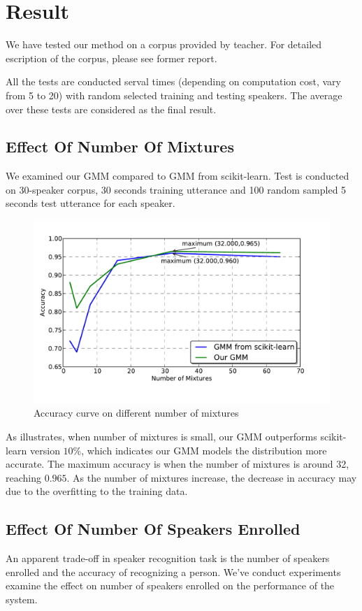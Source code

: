 \section{Result}
We have tested our method on a corpus provided by teacher. For detailed
escription of the corpus, please see former report.

All the tests are conducted serval times (depending on computation cost,
vary from 5 to 20) with random selected training and testing speakers.
The average over these tests are considered as the final
result.

\subsection{Effect Of Number Of Mixtures}
We examined our GMM compared to GMM from scikit-learn.
Test is conducted on 30-speaker corpus, 30 seconds training utterance
and 100 random sampled 5 seconds test utterance for each speaker.

\begin{figure}[!ht]
	\label{fig:mixture}
	\centering
	\includegraphics[width=\linewidth]{res/mixture-both.pdf}
	\caption{Accuracy curve on different number of mixtures}
\end{figure}

As  illustrates, when number of mixtures is small,
our GMM outperforms scikit-learn version $10\%$, which indicates our
GMM models the distribution more accurate. The maximum accuracy
is when the number of mixtures is around 32, reaching $0.965$. As
the number of mixtures increase, the decrease in accuracy
may due to the overfitting to the training data.

\subsection{Effect Of Number Of Speakers Enrolled}
An apparent trade-off in speaker recognition task is the number of speakers
enrolled and the accuracy of recognizing a person. We've conduct experiments
examine the effect on number of speakers enrolled on the performance of the
system.

